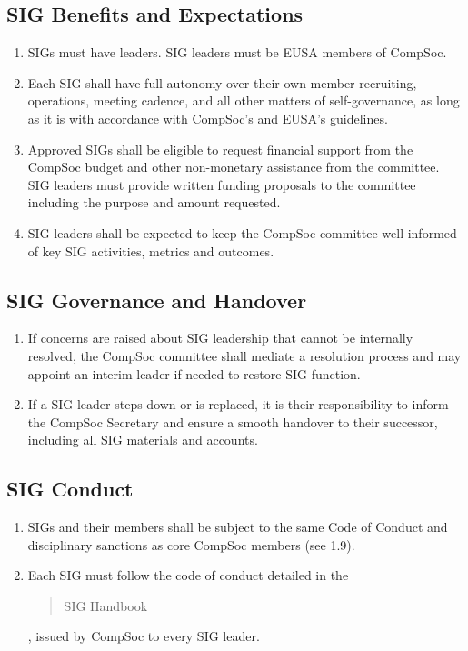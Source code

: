\subsection{SIG Benefits and Expectations}  
\begin{enumerate}
    \item SIGs must have leaders. SIG leaders must be EUSA members of CompSoc.
    \item Each SIG shall have full autonomy over their own member recruiting, operations, meeting cadence, and all other matters of self-governance, as long as it is with accordance with CompSoc's and EUSA's guidelines.  
    \item Approved SIGs shall be eligible to request financial support from the CompSoc budget and other non-monetary assistance from the committee. SIG leaders must provide written funding proposals to the committee including the purpose and amount requested.
    \item SIG leaders shall be expected to keep the CompSoc committee well-informed of key SIG activities, metrics and outcomes.
\end{enumerate}

\subsection{SIG Governance and Handover}
\begin{enumerate}
    \item If concerns are raised about SIG leadership that cannot be internally resolved, the CompSoc committee shall mediate a resolution process and may appoint an interim leader if needed to restore SIG function.
    \item If a SIG leader steps down or is replaced, it is their responsibility to inform the CompSoc Secretary and ensure a smooth handover to their successor, including all SIG materials and accounts.
\end{enumerate}

\subsection{SIG Conduct}
\begin{enumerate}
    \item SIGs and their members shall be subject to the same Code of Conduct and disciplinary sanctions as core CompSoc members (see 1.9).
    \item Each SIG must follow the code of conduct detailed in the \blockquote{SIG Handbook}, issued by CompSoc to every SIG leader.
\end{enumerate}

